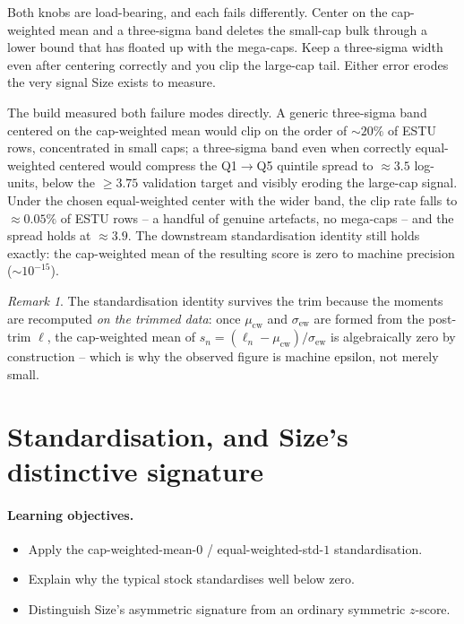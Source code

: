 \documentclass[11pt]{article}
\theoremstyle{definition}
\theoremstyle{plain}
\theoremstyle{remark}
\newtheorem*{remark}{Remark}
\begin{document}
\begin{pitfall}
Both knobs are load-bearing, and each fails differently. Center on the cap-weighted mean and a three-sigma band deletes the small-cap bulk through a lower bound that has floated up with the mega-caps. Keep a three-sigma width even after centering correctly and you clip the large-cap tail. Either error erodes the very signal Size exists to measure.
\end{pitfall}

\begin{observed}
The build measured both failure modes directly. A generic three-sigma band centered on the cap-weighted mean would clip on the order of $\sim20\%$ of ESTU rows, concentrated in small caps; a three-sigma band even when correctly equal-weighted centered would compress the Q1$\to$Q5 quintile spread to $\approx3.5$ log-units, below the $\geq3.75$ validation target and visibly eroding the large-cap signal. Under the chosen equal-weighted center with the wider band, the clip rate falls to $\approx 0.05\%$ of ESTU rows -- a handful of genuine artefacts, no mega-caps -- and the spread holds at $\approx3.9$. The downstream standardisation identity still holds exactly: the cap-weighted mean of the resulting score is zero to machine precision ($\sim 10^{-15}$).
\end{observed}

\begin{remark}
The standardisation identity survives the trim because the moments are recomputed \emph{on the trimmed data}: once $\mu_{\mathrm{cw}}$ and $\sigma_{\mathrm{ew}}$ are formed from the post-trim $\ell$, the cap-weighted mean of $s_n=(\ell_n-\mu_{\mathrm{cw}})/\sigma_{\mathrm{ew}}$ is algebraically zero by construction -- which is why the observed figure is machine epsilon, not merely small.
\end{remark}

\section{Standardisation, and Size's distinctive signature}\label{sec:std}

\paragraph{Learning objectives.}
\begin{itemize}[leftmargin=1.4em,topsep=2pt,itemsep=1pt]
  \item Apply the cap-weighted-mean-$0$ / equal-weighted-std-$1$ standardisation.
  \item Explain why the typical stock standardises well below zero.
  \item Distinguish Size's asymmetric signature from an ordinary symmetric $z$-score.
\end{itemize}
\end{document}
